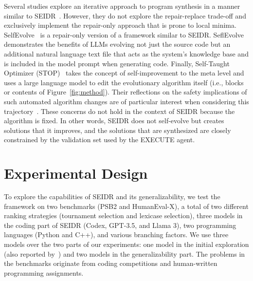 Several studies explore an iterative approach to program synthesis in a manner similar to SEIDR~\cite{xiaConversationalAutomatedProgram2023,chenTeachingLargeLanguage2023,shinnReflexionLanguageAgents2023}. 
However, they do not explore the repair-replace trade-off and exclusively implement the repair-only approach that is prone to local minima.
SelfEvolve~\cite{jiangSelfEvolveCodeEvolution2023} is a repair-only version of a framework similar to SEIDR.
SeflEvolve demonstrates the benefits of LLMs evolving not just the source code but an additional natural language text file that acts as the system's knowledge base and is included in the model prompt when generating code. 
Finally, Self-Taught Optimizer (STOP)~\cite{zelikmanSelfTaughtOptimizerSTOP2023} takes the concept of self-improvement to the meta level and uses a large language model to edit the evolutionary algorithm itself (i.e., blocks or contents of Figure~\ref{fig:method}). 
Their reflections on the safety implications of such automated algorithm changes are of particular interest when considering this trajectory~\cite[section 8]{zelikmanSelfTaughtOptimizerSTOP2023}. These concerns do not hold in the context of SEIDR because the algorithm is fixed.
In other words, SEIDR does not self-evolve but creates solutions that it improves, and the solutions that are synthesized are closely constrained by the validation set used by the EXECUTE agent.

\newpage\section{Experimental Design}
\label{sec:seidr-eval}

To explore the capabilities of SEIDR and its generalizability, we test the framework on two benchmarks (PSB2 and
HumanEval-X), a total of two different ranking strategies (tournament selection and lexicase selection),
three models in the coding part of SEIDR (Codex, GPT-3.5, and Llama 3), two programming languages (Python and C++), and various branching factors.
We use three models over the two parts of our experiments: one model in the initial exploration (also reported by~\cite{liventsevFullyAutonomousProgramming2023}) and two models in the generalizability part.
The problems in the benchmarks originate from coding competitions and human-written programming assignments. 

